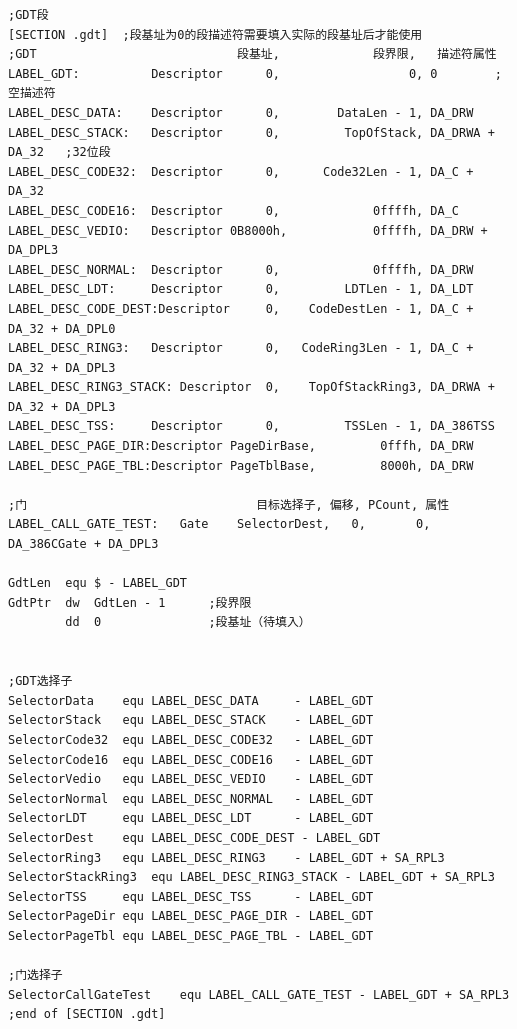 \documentclass[12pt,a4paper,UTF8]{ctexart}
\begin{document}
\begin{lstlisting}
;GDT段
[SECTION .gdt]  ;段基址为0的段描述符需要填入实际的段基址后才能使用
;GDT                            段基址,             段界限,   描述符属性
LABEL_GDT:          Descriptor      0,                  0, 0        ;空描述符
LABEL_DESC_DATA:    Descriptor      0,        DataLen - 1, DA_DRW
LABEL_DESC_STACK:   Descriptor      0,         TopOfStack, DA_DRWA + DA_32   ;32位段
LABEL_DESC_CODE32:  Descriptor      0,      Code32Len - 1, DA_C + DA_32
LABEL_DESC_CODE16:  Descriptor      0,             0ffffh, DA_C
LABEL_DESC_VEDIO:   Descriptor 0B8000h,            0ffffh, DA_DRW + DA_DPL3
LABEL_DESC_NORMAL:  Descriptor      0,             0ffffh, DA_DRW
LABEL_DESC_LDT:     Descriptor      0,         LDTLen - 1, DA_LDT
LABEL_DESC_CODE_DEST:Descriptor     0,    CodeDestLen - 1, DA_C + DA_32 + DA_DPL0
LABEL_DESC_RING3:   Descriptor      0,   CodeRing3Len - 1, DA_C + DA_32 + DA_DPL3
LABEL_DESC_RING3_STACK: Descriptor  0,    TopOfStackRing3, DA_DRWA + DA_32 + DA_DPL3
LABEL_DESC_TSS:     Descriptor      0,         TSSLen - 1, DA_386TSS
LABEL_DESC_PAGE_DIR:Descriptor PageDirBase,         0fffh, DA_DRW
LABEL_DESC_PAGE_TBL:Descriptor PageTblBase,         8000h, DA_DRW

;门                                目标选择子, 偏移, PCount, 属性
LABEL_CALL_GATE_TEST:   Gate    SelectorDest,   0,       0, DA_386CGate + DA_DPL3

GdtLen  equ $ - LABEL_GDT
GdtPtr  dw  GdtLen - 1      ;段界限
        dd  0               ;段基址（待填入）


;GDT选择子
SelectorData    equ LABEL_DESC_DATA     - LABEL_GDT
SelectorStack   equ LABEL_DESC_STACK    - LABEL_GDT
SelectorCode32  equ LABEL_DESC_CODE32   - LABEL_GDT
SelectorCode16  equ LABEL_DESC_CODE16   - LABEL_GDT
SelectorVedio   equ LABEL_DESC_VEDIO    - LABEL_GDT
SelectorNormal  equ LABEL_DESC_NORMAL   - LABEL_GDT
SelectorLDT     equ LABEL_DESC_LDT      - LABEL_GDT
SelectorDest    equ LABEL_DESC_CODE_DEST - LABEL_GDT
SelectorRing3   equ LABEL_DESC_RING3    - LABEL_GDT + SA_RPL3
SelectorStackRing3  equ LABEL_DESC_RING3_STACK - LABEL_GDT + SA_RPL3
SelectorTSS     equ LABEL_DESC_TSS      - LABEL_GDT
SelectorPageDir equ LABEL_DESC_PAGE_DIR - LABEL_GDT
SelectorPageTbl equ LABEL_DESC_PAGE_TBL - LABEL_GDT

;门选择子
SelectorCallGateTest    equ LABEL_CALL_GATE_TEST - LABEL_GDT + SA_RPL3
;end of [SECTION .gdt]
\end{lstlisting}
\end{document}
